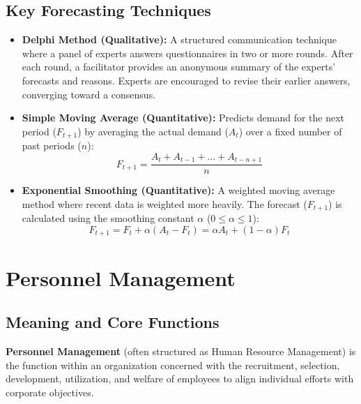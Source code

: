 \documentclass[12pt,a4paper]{article}
\begin{document}
\subsection{Key Forecasting Techniques}
\begin{itemize}[leftmargin=*, itemsep=3.5pt]
  \item \textbf{Delphi Method (Qualitative):} A structured communication technique where a panel of experts answers questionnaires in two or more rounds. After each round, a facilitator provides an anonymous summary of the experts' forecasts and reasons. Experts are encouraged to revise their earlier answers, converging toward a consensus.
  \item \textbf{Simple Moving Average (Quantitative):} Predicts demand for the next period ($F_{t+1}$) by averaging the actual demand ($A_t$) over a fixed number of past periods ($n$):
    \begin{equation}
      F_{t+1} = \frac{A_t + A_{t-1} + \dots + A_{t-n+1}}{n}
    \end{equation}
  \item \textbf{Exponential Smoothing (Quantitative):} A weighted moving average method where recent data is weighted more heavily. The forecast ($F_{t+1}$) is calculated using the smoothing constant $\alpha$ ($0 \le \alpha \le 1$):
    \begin{equation}
      F_{t+1} = F_t + \alpha (A_t - F_t) = \alpha A_t + (1 - \alpha) F_t
    \end{equation}
\end{itemize}

\section{Personnel Management}

\subsection{Meaning and Core Functions}
\begin{tcolorbox}[defbox, title={Definition of Personnel Management}]
\textbf{Personnel Management} (often structured as Human Resource Management) is the function within an organization concerned with the recruitment, selection, development, utilization, and welfare of employees to align individual efforts with corporate objectives.
\end{tcolorbox}
\end{document}
